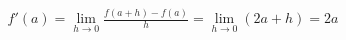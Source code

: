 \documentclass[preview]{standalone}
\begin{document}
\begin{align*}
f'(a) = \lim_{h \to 0} \frac{f(a+h) - f(a)}{h} = \lim_{h \to 0}(2a + h) = 2a
\end{align*}
\end{document}

